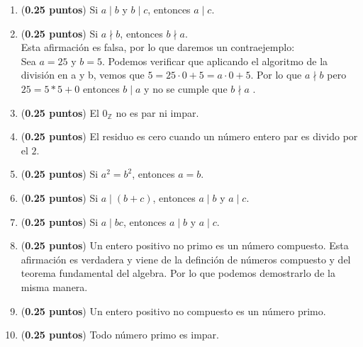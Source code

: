 \documentclass[fontsize=12pt]{scrartcl}
\begin{document}
\begin{enumerate}
		\item ({\bf 0.25 puntos})
		Si $a \mid b$ y $b \mid c$, entonces $a \mid c$.

		\item ({\bf 0.25 puntos})
		  Si $a \nmid b$, entonces $b \nmid a$. \\
                  Esta afirmación es falsa, por lo que daremos un contraejemplo: \\
                  Sea $a=25$ y  $b=5$. Podemos verificar que aplicando el algoritmo de la división en a y b, vemos que $5 = 25 \cdot 0 + 5 = a \cdot 0 +5 $. Por lo que $a \nmid b$ pero $25 = 5 * 5 +0$ entonces $b \mid a$ y no se cumple que  $b \nmid a$ .
		
		\item ({\bf 0.25 puntos})
		El $0_{\mathbb{Z}}$ no es par ni impar.
		
		\item ({\bf 0.25 puntos})
		El residuo es cero cuando un n\'umero entero par es divido por el $2$.
		
		\item ({\bf 0.25 puntos})
		Si $a^{2} = b^{2}$, entonces $a = b$.
		
		\item ({\bf 0.25 puntos})
		Si $a \mid (b + c)$, entonces $a \mid b$ y $a \mid c$.
		
		\item ({\bf 0.25 puntos})
		Si $a \mid bc$, entonces $a \mid b$ y $a \mid c$.

		\item ({\bf 0.25 puntos})
		  Un entero positivo no primo es un n\'umero compuesto.
                 Esta afirmación es verdadera y viene de la definción de números compuesto y del teorema fundamental del algebra. Por lo que podemos demostrarlo de la misma manera.
		
		\item ({\bf 0.25 puntos})
		Un entero positivo no compuesto es un n\'umero primo.
		
		\item ({\bf 0.25 puntos})
		Todo n\'umero primo es impar.


\end{enumerate}
\end{document}
